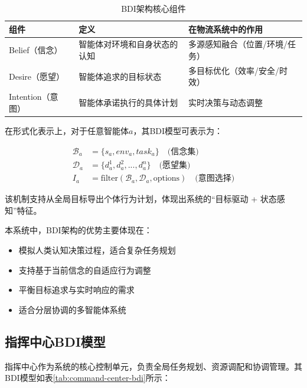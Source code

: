 \documentclass[12pt,a4paper]{article}
\begin{document}
\begin{table}[h]
\centering
\caption{BDI架构核心组件}
\label{tab:bdi-components}
\begin{tabular}{|>{\centering\arraybackslash}p{3cm}|>{\raggedright\arraybackslash}p{5cm}|>{\raggedright\arraybackslash}p{6cm}|}
\hline
\textbf{组件} & \textbf{定义} & \textbf{在物流系统中的作用} \\
\hline
\rowcolor{lightgray}
Belief（信念） & 智能体对环境和自身状态的认知 & 多源感知融合（位置/环境/任务） \\
\hline
Desire（愿望） & 智能体追求的目标状态 & 多目标优化（效率/安全/时效） \\
\hline
\rowcolor{lightgray}
Intention（意图） & 智能体承诺执行的具体计划 & 实时决策与动态调整 \\
\hline
\end{tabular}
\end{table}

在形式化表示上，对于任意智能体$a$，其BDI模型可表示为：

\begin{align}
\mathcal{B}_a &= \{s_a, env_a, task_a\} \quad \text{(信念集)} \\
\mathcal{D}_a &= \{d^1_a, d^2_a, ..., d^n_a\} \quad \text{(愿望集)} \\
I_a &= \text{filter}(\mathcal{B}_a, \mathcal{D}_a, \text{options}) \quad \text{(意图选择)}
\end{align}

该机制支持从全局目标导出个体行为计划，体现出系统的“目标驱动 + 状态感知”特征。

本系统中，BDI架构的优势主要体现在：
\begin{itemize}
    \item 模拟人类认知决策过程，适合复杂任务规划
    \item 支持基于当前信念的自适应行为调整
    \item 平衡目标追求与实时响应的需求
    \item 适合分层协调的多智能体系统
\end{itemize}

\subsection{指挥中心BDI模型}

指挥中心作为系统的核心控制单元，负责全局任务规划、资源调配和协调管理。其BDI模型如表\ref{tab:command-center-bdi}所示：
\end{document}
